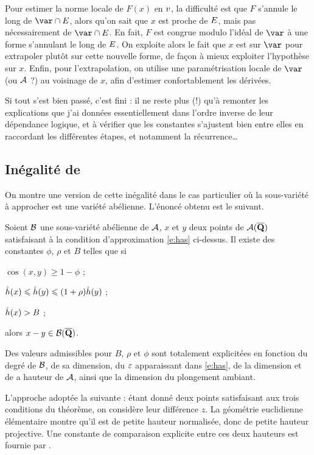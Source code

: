 Pour estimer la norme locale de $F(x)$ en $v$, la difficulté est que $F$
s'annule le long de $\var \cap \divi$, alors qu'on sait que $x$ est proche de $E$,
mais pas nécessairement de $\var \cap \divi$. En fait, $F$ est congrue modulo l'idéal
de $\var$ à une forme s'annulant le long de $E$. On exploite alors le fait que
$x$ est sur $\var$ pour extrapoler plutôt sur cette nouvelle forme, de façon à
mieux exploiter l'hypothèse sur $x$. Enfin, pour l'extrapolation, on utilise
une paramétrisation locale de $\var$ (ou $\mathcal A$ ?) au voisinage de $x$, afin
d'estimer confortablement les dérivées.

\medskip

Si tout s'est bien passé, c'est fini : il ne reste plus (!) qu'à remonter les
explications que j'ai données essentiellement dans l'ordre inverse de leur
dépendance logique, et à vérifier que les constantes s'ajustent bien entre
elles en raccordant les différentes étapes, et notamment la récurrence\dots


\subsection{Inégalité de }

On montre une version de cette inégalité dans le cas particulier où la
sous-variété à approcher est une variété abélienne.  L'énoncé obtenu est le
suivant.

\begin{thm} \label{t:mumford-intro}
  Soient $\mathcal B$ une sous-variété abélienne de $\mathcal A$, $x$ et $y$
  deux points de $\mathcal A(\overline{{\mathbf{Q}}})$ satisfaisant à la condition d'approximation
  \eqref{e:has} ci-dessus. Il existe des constantes $\phi$, $\rho$ et $B$
  telles que si
  \begin{enumthm}
    \item $\cos(x, y) \ge 1 - \phi$ ;
    \item $\hat h (x) \leqslant \hat h (y) \leqslant (1+\rho) \hat h (y)$ ;
    \item $\hat h (x) > B$ ;
  \end{enumthm}
  alors $x - y \in \mathcal B(\overline{{\mathbf{Q}}})$.
\end{thm}

Des valeurs admissibles pour $B$, $\rho$ et $\phi$ sont totalement explicitées
en fonction du degré de $\mathcal B$, de sa dimension, du $\varepsilon$ apparaissant dans
\eqref{e:has}, de la dimension et de a hauteur de $\mathcal A$, ainsi que la dimension
du plongement ambiant.

L'approche adoptée la suivante : étant donné deux points satisfaisant aux
trois conditions du théorème, on considère leur différence $z$. La
géométrie euclidienne élémentaire montre qu'il est de petite hauteur
normalisée, donc de petite hauteur projective. Une constante de comparaison
explicite entre ces deux hauteurs est fournie par \cite{daphimhva2}.

